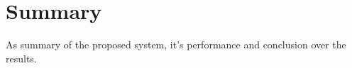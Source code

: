 \section{Summary}

As summary of the proposed system, it's performance and conclusion over the results.
